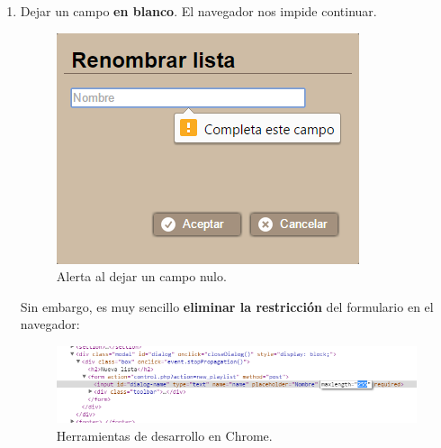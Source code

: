 \begin{enumerate}
	\item Dejar un campo \textbf{en blanco}. El navegador nos impide continuar.
	
	\smallskip
	
	\begin{figure}[H]
		\noindent \begin{centering}
			\includegraphics[width=\linewidth/3]{capitulo6/cap_camponulo}
			\par\end{centering}
		\smallskip
		\caption{\label{fig:cap_camponulo} Alerta al dejar un campo nulo.}
	\end{figure}
	
	\smallskip
	
	Sin embargo, es muy sencillo \textbf{eliminar la restricción} del formulario en el navegador:
	
	\smallskip
	
	\begin{figure}[H]
		\noindent \begin{centering}
			\includegraphics[width=\linewidth*3/4]{capitulo6/cap_hackform}
			\par\end{centering}
		\smallskip
		\caption{\label{fig:cap_hackform} Herramientas de desarrollo en Chrome.}
	\end{figure}
	

\end{enumerate}
